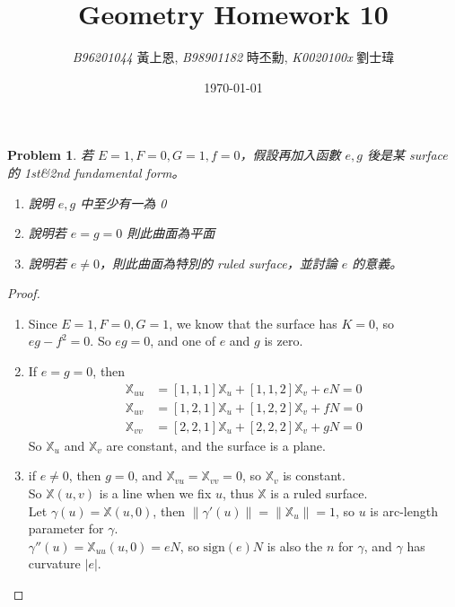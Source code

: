 \documentclass[10pt,a4paper]{article}
\newcommand{\LiHei}{\CJKfamily{lh}}
\newcounter{theProblemCounter}
\newtheorem{problem}[theProblemCounter]{Problem}
\begin{document}
\title{{Geometry Homework 10}}
\author{{\it{B96201044}} {\LiHei 黃上恩}, {\it{B98901182}} {\LiHei 時丕勳}, {\it{K0020100x}} {\LiHei 劉士瑋}}
\date{\today}
\maketitle

\newcommand{\bx}{\mathbb{X}}
\newcommand{\bfx}{\mathbf{X}}
\newcommand{\grad}{\textrm{grad }}
\newcommand{\sech}{\mbox{sech}}

\setcounter{theProblemCounter}{1}
\begin{problem} 若 $E=1, F=0, G=1, f=0$，假設再加入函數 $e, g$ 後是某 surface 的 1st\&2nd fundamental form。
\begin{enumerate}
\item[(a)] 說明 $e, g$ 中至少有一為 0
\item[(b)] 說明若 $e=g=0$ 則此曲面為平面
\item[(c)] 說明若 $e\ne 0$，則此曲面為特別的 ruled surface，並討論 $e$ 的意義。
\end{enumerate}
\end{problem}
\begin{proof}
\begin{enumerate}
\item[(a)]
Since $E=1, F=0, G=1$, we know that the surface has $K=0$, so $eg-f^2=0$. So $eg=0$, and one of $e$ and $g$ is zero.
\item[(b)]
If $e=g=0$, then
\begin{align*}
\bx_{uu}&=[1,1,1]\bx_u+[1,1,2]\bx_v+eN=0\\
\bx_{uv}&=[1,2,1]\bx_u+[1,2,2]\bx_v+fN=0\\
\bx_{vv}&=[2,2,1]\bx_u+[2,2,2]\bx_v+gN=0
\end{align*}
So $\bx_u$ and $\bx_v$ are constant, and the surface is a plane.
\item[(c)]
if $e\ne 0$, then $g=0$, and $\bx_{vu}=\bx_{vv}=0$, so $\bx_v$ is constant.\\
So $\bx(u,v)$ is a line when we fix $u$, thus $\bx$ is a ruled surface.\\
Let $\gamma(u)=\bx(u,0)$, then $\|\gamma'(u)\|=\|\bx_u\|=1$, so $u$ is arc-length parameter for $\gamma$.\\
$\gamma''(u)=\bx_{uu}(u,0)=eN$, so $\textrm{sign}(e)N$ is also the $n$ for $\gamma$, and $\gamma$ has curvature $|e|$.
\end{enumerate}
\end{proof}
\end{document}
